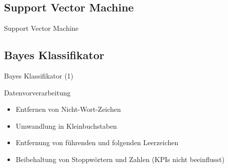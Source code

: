 \documentclass[aspectratio=169]{beamer} %
\begin{document}
\subsection{Support Vector Machine}

\begin{frame}{Support Vector Machine}

\end{frame}

\subsection{Bayes Klassifikator}

\begin{frame}{Bayes Klassifikator (1)}
    \begin{block}{Datenvorverarbeitung}
        \begin{itemize}
            \item Entfernen von Nicht-Wort-Zeichen
            \item Umwandlung in Kleinbuchstaben
            \item Entfernung von f\"uhrenden und folgenden Leerzeichen
            \item Beibehaltung von Stoppw\"ortern und Zahlen (KPIs nicht beeinflusst)
        \end{itemize}
    \end{block}
\end{frame}
\end{document}
